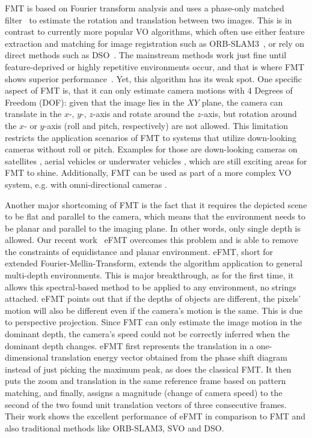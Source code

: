 \documentclass[letterpaper, 10 pt, conference]{ieeeconf}  %
\begin{document}
FMT is based on Fourier transform analysis and uses a phase-only matched filter~\cite{chen1994symmetric} to estimate the rotation and translation between two images. This is in contrast to currently more popular VO algorithms, which often use either feature extraction and matching for image registration such as ORB-SLAM3~\cite{ORBSLAM3_2020}, or rely on direct methods such as DSO~\cite{Engel-et-al-pami2018}. The mainstream methods work just fine until feature-deprived or highly repetitive environments occur, and that is where FMT shows superior performance~\cite{xu2019improved, 387491, 4290156, 4584311, 10.1007/978-3-642-13408-1_14}. Yet, this algorithm has its weak spot. One specific aspect of FMT is, that it can only estimate camera motions with 4 Degrees of Freedom (DOF): given that the image lies in the $XY$ plane, the camera can translate in the $x$-, $y$-, $z$-axis and rotate around the $z$-axis, but rotation around the $x$- or $y$-axis (roll and pitch, respectively) are not allowed. This limitation restricts the application scenarios of FMT to systems that utilize down-looking cameras without roll or pitch. Examples for those are down-looking cameras on satellites \cite{le2011image}, aerial vehicles \cite{grabe2015nonlinear,sa2018weedmap} or underwater vehicles \cite{pfingsthorn2013large}, which are still exciting areas for FMT to shine. Additionally, FMT can be used as part of a more complex VO system, e.g. with omni-directional cameras \cite{kuang2019pose,xu2019improved, 4587553}.

Another major shortcoming of FMT is the fact that it requires the depicted scene to be flat and parallel to the camera, which means that the environment needs to be planar and parallel to the imaging plane. In other words, only single depth is allowed. Our recent work~\cite{xu2021rethinking} eFMT overcomes this problem and is able to remove the constraints of equidistance and planar environment. eFMT, short for extended Fourier-Mellin-Transform, extends the algorithm application to general multi-depth environments. This is major breakthrough, as for the first time, it allows this spectral-based method to be applied to any environment, no strings attached. eFMT points out that if the depths of objects are different, the pixels' motion will also be different even if the camera's motion is the same. This is due to perspective projection. Since FMT can only estimate the image motion in the dominant depth, the camera's speed could not be correctly inferred when the dominant depth changes. eFMT first represents the translation in a one-dimensional translation energy vector obtained from the phase shift diagram instead of just picking the maximum peak, as does the classical FMT. It then puts the zoom and translation in the same reference frame based on pattern matching, and finally, assigns a magnitude (change of camera speed) to the second of the two found unit translation vectors of three consecutive frames.
Their work shows the excellent performance of eFMT in comparison to FMT and also traditional methods like ORB-SLAM3, SVO \cite{forster2016svo} and DSO.
\end{document}
